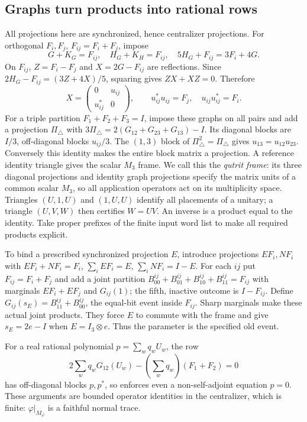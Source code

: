 \subsection{Graphs turn products into rational rows}
All projections here are synchronized, hence centralizer projections.
For orthogonal $F_i,F_j$, $F_{ij}=F_i+F_j$, impose
\begin{equation}\label{eq:graph}
 G+K_G=F_{ij},\quad H_G+K_H=F_{ij},\quad 5H_G+F_{ij}=3F_i+4G .
\end{equation}
On $F_{ij}$, $Z=F_i-F_j$ and $X=2G-F_{ij}$ are reflections.
Since $2H_G-F_{ij}=(3Z+4X)/5$, squaring gives $ZX+XZ=0$.
Therefore
\[
 X=\begin{pmatrix}0&u_{ij}\\u_{ij}^*&0\end{pmatrix},
 \qquad u_{ij}^*u_{ij}=F_j,\quad u_{ij}u_{ij}^*=F_i.
\]
For a triple partition $F_1+F_2+F_3=I$, impose these graphs on
all pairs and add a projection $\Pi_\triangle$ with
$3\Pi_\triangle=2(G_{12}+G_{23}+G_{13})-I$.
Its diagonal blocks are $I/3$, off-diagonal blocks $u_{ij}/3$.
The $(1,3)$ block of $\Pi_\triangle^2=\Pi_\triangle$ gives $u_{13}=u_{12}u_{23}$.
Conversely this identity makes the entire block matrix a projection.
A reference identity triangle gives the scalar $M_3$ frame.
We call this the \emph{qutrit frame}: its three diagonal projections
and identity graph projections specify the matrix units of a common
scalar $M_3$, so all application operators act on its multiplicity
space.
Triangles $(U,1,U)$ and $(1,U,U)$ identify all placements of a unitary;
a triangle $(U,V,W)$ then certifies $W=UV$.
An inverse is a product equal to the identity. Take proper prefixes
of the finite input word list to make all required products explicit.

To bind a prescribed synchronized projection $E$, introduce
projections $EF_i,NF_i$ with
$EF_i+NF_i=F_i$, $\sum_iEF_i=E$, $\sum_iNF_i=I-E$.
For each $ij$ put $F_{ij}=F_i+F_j$ and add a joint partition
$B^{ij}_{00}+B^{ij}_{01}+B^{ij}_{10}+B^{ij}_{11}=F_{ij}$ with marginals
$EF_i+EF_j$ and $G_{ij}(1)$; the fifth, inactive outcome is $I-F_{ij}$.
Define $G_{ij}(s_E)=B^{ij}_{11}+B^{ij}_{00}$, the equal-bit event inside $F_{ij}$.
Sharp marginals make these actual joint products.
They force $E$ to commute with the frame and give
$s_E=2e-I$ when $E=I_3\otimes e$.
Thus the parameter is the specified old event.

For a real rational polynomial $p=\sum_wq_wU_w$, the row
\begin{equation}\label{eq:offdiag}
 2\sum_wq_wG_{12}(U_w)
 -\left(\sum_wq_w\right)(F_1+F_2)=0
\end{equation}
has off-diagonal blocks $p,p^*$, so enforces even a non-self-adjoint
equation $p=0$. These arguments are bounded operator identities
in the centralizer, which is finite: $\varphi|_{M_\varphi}$ is a
faithful normal trace.

